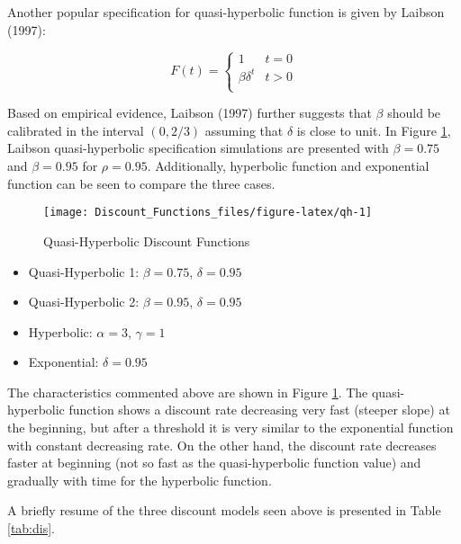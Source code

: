 \documentclass[]{article}
\providecommand{\tightlist}{%
  \setlength{\itemsep}{0pt}\setlength{\parskip}{0pt}}
\begin{document}
Another popular specification for quasi-hyperbolic function is given by Laibson (1997):

\[ F(t)=\begin{cases} 
1 & t = 0 \\
\beta\delta^t & t>0 \\ 
\end{cases}
\]

Based on empirical evidence, Laibson (1997) further suggests that \(\beta\) should be calibrated in the interval \((0, 2/3 )\) assuming that \(\delta\) is close to unit. In Figure \ref{fig:qh}, Laibson quasi-hyperbolic specification simulations are presented with \(\beta=0.75\) and \(\beta=0.95\) for \(\rho=0.95\). Additionally, hyperbolic function and exponential function can be seen to compare the three cases.

\begin{figure}

{\centering \texttt{[image: Discount\_Functions\_files/figure-latex/qh-1]} 

}

\caption{Quasi-Hyperbolic Discount Functions}\label{fig:qh}
\end{figure}

\begin{itemize}
\tightlist
\item
  Quasi-Hyperbolic 1: \(\beta = 0.75\), \(\delta = 0.95\)
\item
  Quasi-Hyperbolic 2: \(\beta = 0.95\), \(\delta = 0.95\)
\item
  Hyperbolic: \(\alpha = 3\), \(\gamma = 1\)
\item
  Exponential: \(\delta = 0.95\)
\end{itemize}

The characteristics commented above are shown in Figure \ref{fig:qh}. The quasi-hyperbolic function shows a discount rate decreasing very fast (steeper slope) at the beginning, but after a threshold it is very similar to the exponential function with constant decreasing rate. On the other hand, the discount rate decreases faster at beginning (not so fast as the quasi-hyperbolic function value) and gradually with time for the hyperbolic function.

A briefly resume of the three discount models seen above is presented in Table \ref{tab:dis}.
\end{document}
